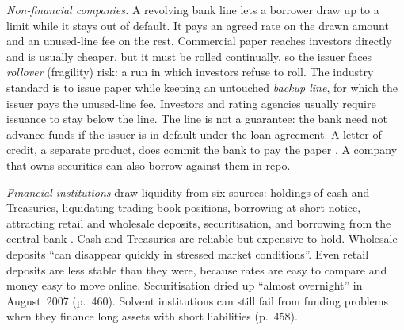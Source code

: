 \begin{qfdefinition}\label{def:short-term-funding-repo}
 \emph{Non-financial companies.} A revolving bank line lets a borrower draw up to a limit while it stays out of default. It pays an agreed rate on the drawn amount and an unused-line fee on the rest. Commercial paper reaches investors directly and is usually cheaper, but it must be rolled continually, so the issuer faces \emph{rollover} (fragility) risk: a run in which investors refuse to roll. The industry standard is to issue paper while keeping an untouched \emph{backup line}, for which the issuer pays the unused-line fee. Investors and rating agencies usually require issuance to stay below the line. The line is not a guarantee: the bank need not advance funds if the issuer is in default under the loan agreement. A letter of credit, a separate product, does commit the bank to pay the paper \citep[chap.~13, pp.~306--308]{s7-fabozzifixed}. A company that owns securities can also borrow against them in repo.

\emph{Financial institutions} draw liquidity from six sources: holdings of cash and Treasuries, liquidating trading-book positions, borrowing at short notice, attracting retail and wholesale deposits, securitisation, and borrowing from the central bank \citep[chap.~21, sec.~21.2, p.~459]{risk-management-financial-institutions-2023}. Cash and Treasuries are reliable but expensive to hold. Wholesale deposits ``can disappear quickly in stressed market conditions''. Even retail deposits are less stable than they were, because rates are easy to compare and money easy to move online. Securitisation dried up ``almost overnight'' in August~2007 (p.~460). Solvent institutions can still fail from funding problems when they finance long assets with short liabilities (p.~458).


\end{qfdefinition}

